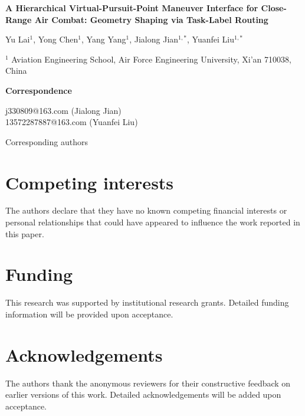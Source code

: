 \documentclass[12pt,a4paper]{article}
\begin{document}
\thispagestyle{empty}

\begin{center}
\vspace*{2cm}

{\LARGE\bfseries A Hierarchical Virtual-Pursuit-Point Maneuver Interface for Close-Range Air Combat: Geometry Shaping via Task-Label Routing\par}

\vspace{2cm}

{\large
Yu Lai$^{1}$, Yong Chen$^{1}$, Yang Yang$^{1}$, Jialong Jian$^{1,*}$, Yuanfei Liu$^{1,*}$\par}

\vspace{1cm}

{\normalsize
$^{1}$ Aviation Engineering School, Air Force Engineering University, Xi'an 710038, China\par}

\vspace{2cm}

{\normalsize\textbf{Correspondence}}\\[0.5em]
{\normalsize j330809@163.com (Jialong Jian)\\
13572287887@163.com (Yuanfei Liu)\par}

\vfill

{\small * Corresponding authors}

\end{center}

\newpage

\section*{Competing interests}

The authors declare that they have no known competing financial interests or personal relationships that could have appeared to influence the work reported in this paper.

\section*{Funding}

This research was supported by institutional research grants. Detailed funding information will be provided upon acceptance.

\section*{Acknowledgements}

The authors thank the anonymous reviewers for their constructive feedback on earlier versions of this work. Detailed acknowledgements will be added upon acceptance.
\end{document}
